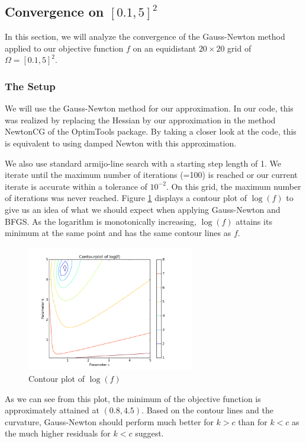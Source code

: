 \documentclass{article}
\begin{document}
\subsection{Convergence on $[0.1,5]^2$}
In this section, we will analyze the convergence of the Gauss-Newton method
applied to our objective function $f$ on an equidistant $20 \times 20$ grid
of $\Omega=[0.1,5]^2$.
\subsubsection{The Setup}
We will use the Gauss-Newton method for our approximation. In our code,
this was realized by replacing the Hessian by our approximation in the
method NewtonCG of the OptimTools package. By taking a closer look at the code,
this is equivalent to using damped Newton with this approximation.\par
We also use standard armijo-line search with a starting step length of 1. We iterate until the 
maximum number of iterations (=100) is reached or our current iterate is accurate within
a tolerance of $10^{-2}$. On this grid, the maximum number of iterations was never reached. Figure \ref{contour} displays a contour plot of $\log(f)$ to give us
an idea of what we should expect when applying Gauss-Newton and BFGS. As the logarithm is
monotonically increasing, $\log(f)$ attains its minimum at the same point and has the same contour
lines as $f$.
\begin{figure}
    \centering
        \includegraphics[width=0.65\textwidth]{contour}
        \caption{Contour plot of $\log(f)$}
        \label{contour}
\end{figure}
As we can see from this plot, the minimum of the objective function is approximately attained at $(0.8,4.5)$.
Based on the contour lines and the curvature, Gauss-Newton should perform much better for $k>c$
than for $k<c$ as the much higher residuals for $k<c$ suggest.
\end{document}
